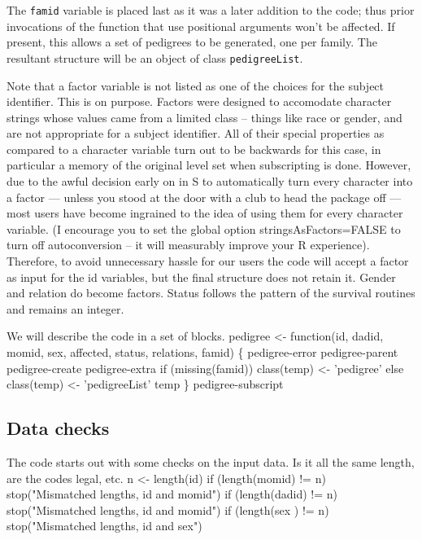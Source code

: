 \documentclass{article}
\begin{document}
The {\tt{}famid} variable is placed last as it was a later addition to the
code; thus prior invocations of the function that use positional 
arguments won't be affected.
If present, this allows a set of pedigrees to be generated, one per
family.  The resultant structure will be an object of class
{\tt{}pedigreeList}.

Note that a factor variable is not listed as one of the choices for the
subject identifier. This is on purpose.  Factors
were designed to accomodate character strings whose values came from a limited
class -- things like race or gender, and are not appropriate for a subject
identifier.  All of their special properties as compared to a character
variable turn out to be backwards for this case, in particular a memory
of the original level set when subscripting is done.
However, due to the awful decision early on in S to automatically turn every
character into a factor --- unless you stood at the door with a club to
head the package off --- most users have become ingrained to the idea of
using them for every character variable. 
(I encourage you to set the global option stringsAsFactors=FALSE to turn
off autoconversion -- it will measurably improve your R experience).
Therefore, to avoid unnecessary hassle for our users 
the code will accept a factor as input for the id variables, but
the final structure does not retain it.  
Gender and relation do become factors.  Status follows the pattern of the 
survival routines and remains an integer.

We will describe the code in a set of blocks.
\endmoddef
pedigree <- function(id, dadid, momid, sex, affected, status, relations,
                     famid) \{
    \LA{}pedigree-error\RA{}
    \LA{}pedigree-parent\RA{}
    \LA{}pedigree-create\RA{}
    \LA{}pedigree-extra\RA{}
    if (missing(famid)) class(temp) <- 'pedigree'
    else class(temp) <- 'pedigreeList'
    temp
    \}
\LA{}pedigree-subscript\RA{}
\nwendcode{}\nwdocspar

\subsection{Data checks}
The code starts out with some checks on the input data.  
Is it all the same length, are the codes legal, etc.
\nwenddocs{}\endmoddef
n <- length(id)
if (length(momid) != n) stop("Mismatched lengths, id and momid")
if (length(dadid) != n) stop("Mismatched lengths, id and momid")
if (length(sex  ) != n) stop("Mismatched lengths, id and sex")
\end{document}
